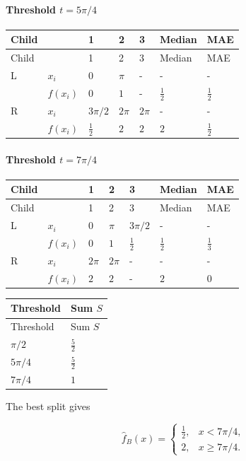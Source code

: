 \documentclass[10pt]{article}
\begin{document}
\paragraph*{Threshold $t=5\pi/4$}
\begingroup
\small
\setlength{\tabcolsep}{4pt}
\begin{longtable}{l|l|l|l|l|l|l}
Child &  & 1 & 2 & 3 & Median & MAE \\
\hline
\endfirsthead
Child &  & 1 & 2 & 3 & Median & MAE \\
\hline
\endhead
L & $x_i$ & $0$ & $\pi$ & - & - & - \\[3pt]
 & $f(x_i)$ & $0$ & $1$ & - & $\frac{1}{2}$ & $\frac{1}{2}$ \\[3pt]
R & $x_i$ & $3\pi/2$ & $2\pi$ & $2\pi$ & - & - \\[3pt]
 & $f(x_i)$ & $\frac{1}{2}$ & $2$ & $2$ & $2$ & $\frac{1}{2}$ \\[3pt]
\end{longtable}
\endgroup
\paragraph*{Threshold $t=7\pi/4$}
\begingroup
\small
\setlength{\tabcolsep}{4pt}
\begin{longtable}{l|l|l|l|l|l|l}
Child &  & 1 & 2 & 3 & Median & MAE \\
\hline
\endfirsthead
Child &  & 1 & 2 & 3 & Median & MAE \\
\hline
\endhead
L & $x_i$ & $0$ & $\pi$ & $3\pi/2$ & - & - \\[3pt]
 & $f(x_i)$ & $0$ & $1$ & $\frac{1}{2}$ & $\frac{1}{2}$ & $\frac{1}{3}$ \\[3pt]
R & $x_i$ & $2\pi$ & $2\pi$ & - & - & - \\[3pt]
 & $f(x_i)$ & $2$ & $2$ & - & $2$ & $0$ \\[3pt]
\end{longtable}
\endgroup
\begingroup
\small
\setlength{\tabcolsep}{4pt}
\begin{longtable}{l|l}
Threshold & Sum $S$ \\
\hline
\endfirsthead
Threshold & Sum $S$ \\
\hline
\endhead
$\pi/2$ & $\frac{5}{2}$ \\[1.5pt]
$5\pi/4$ & $\frac{5}{2}$ \\[1.5pt]
$7\pi/4$ & $1$ \\[1.5pt]
\end{longtable}
\endgroup
The best split gives

\[
\hat f_B(x)=\begin{cases}\frac{1}{2},&x<7\pi/4,\\2,&x\geq 7\pi/4.\end{cases}
\]
\end{document}
